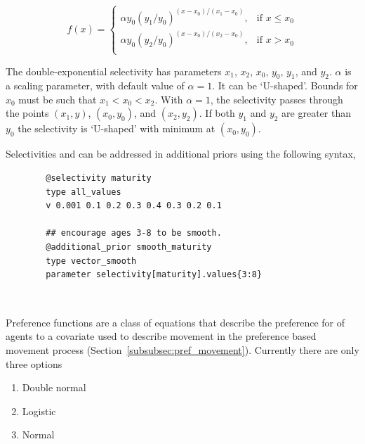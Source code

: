\subsubsection[Double-exponential]{}

\begin{equation} 
f(x)=\begin{cases}
	  \alpha y_0(y_1 / y_0)^{(x-x_0)/(x_1-x_0)}, & \text{if $x \le x_0$} \\
	  \alpha y_0(y_2 / y_0)^{(x-x_0)/(x_2-x_0)}, & \text{if $x > x_0$} \\
  \end{cases}
\end{equation}

The double-exponential selectivity has  parameters $x_1$, $x_2$, $x_0$, $y_0$, $y_1$, and $y_2$.  $\alpha$ is a scaling parameter, with default value of $\alpha = 1$. It can be `U-shaped'. Bounds for $x_0$ must be such that $x_1 < x_0 < x_2$. With $\alpha=1$, the selectivity passes through the points $(x_1, y)$, $(x_0, y_0)$, and $(x_2, y_2)$. If both $y_1$ and $y_2$ are greater than $y_0$ the selectivity is `U-shaped' with minimum at $(x_0, y_0)$.


Selectivities  and  can be addressed in additional priors using the following syntax,

{\small{\begin{verbatim}
		@selectivity maturity
		type all_values
		v 0.001 0.1 0.2 0.3 0.4 0.3 0.2 0.1
		
		## encourage ages 3-8 to be smooth.
		@additional_prior smooth_maturity
		type vector_smooth
		parameter selectivity[maturity].values{3:8}
		
		\end{verbatim}}}
	
\subsection{\label{sec:preference_functions}}
Preference functions are a class of equations that describe the preference for of agents to a covariate used to describe movement in the preference based movement process (Section~\ref{subsubsec:pref_movement}). Currently there are only three options

\begin{enumerate}
	\item Double normal
	\item Logistic
	\item Normal
\end{enumerate}

